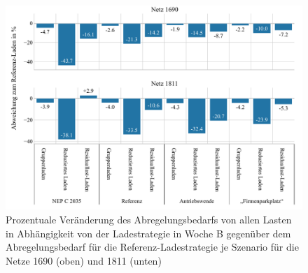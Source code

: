 \begin{figure}[H]
    \centering
    \includegraphics[width=\textwidth]{Bilder/1690_1811_cur_load_grid_week_B}
    \caption{Prozentuale Veränderung des Abregelungsbedarfs von allen Lasten in Abhängigkeit von der Ladestrategie in Woche B gegenüber dem Abregelungsbedarf für die Referenz-Ladestrategie je Szenario für die Netze \num{1690} (oben) und \num{1811} (unten)}\label{fig:1690_1811_cur_load_grid_week_B}
\end{figure}